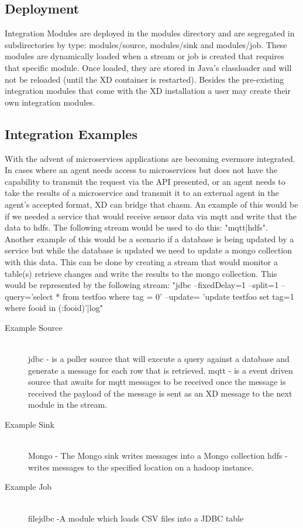 \subsection{Deployment}
Integration Modules are deployed in the modules directory and are segregated in 
subdirectories by type: modules/source, modules/sink and modules/job.  
These modules are dynamically loaded when a stream or job is created that requires that 
specific module.  Once loaded, they are stored in Java's classloader and will not be 
reloaded (until the XD container is restarted).  Besides the pre-existing integration 
modules that come with the XD installation a user may create their own integration 
modules. \par

\subsection{Integration Examples}
With the advent of microservices \cite{microservices-pattern} applications are becoming 
evermore integrated.  In cases where an agent needs access to microservices but does not 
have the capability to transmit the request via the API presented, or an agent needs to 
take the results of a microservice and transmit it to  an external agent in the agent's 
accepted format, XD can bridge that chasm. 
An example of this would be if we needed a service that would receive sensor data via mqtt 
and write that the data to hdfs. The following stream would be used to do this: "mqtt|hdfs".
Another example of this would be a scenario if a database is being updated by a service 
but while the database is updated we need to update a mongo collection 
with this data.  This can be done by creating a stream that would monitor a table(s) 
retrieve changes and write the results to the mongo collection.  This would be 
represented by the following stream: 
"jdbc --fixedDelay=1 --split=1 --query='select * from testfoo where tag = 0' --update=
'update testfoo set tag=1 where fooid in (:fooid)'|log" 
\begin{description}
\item[Example Source] \hfill \\
jdbc - is a poller source that will execute a query against a database and generate a 
message for each row that is retrieved.  \cite{jdbc-module}
mqtt - is a event driven source that awaits for mqtt messages to be received once the message is
 received the payload of the message is sent as an XD message to the next module in the 
 stream.  \cite{mqtt-module}
\item[Example Sink] \hfill \\
Mongo - The Mongo sink writes messages into a Mongo collection \cite{mongo-module}
hdfs - writes messages to the specified location on a hadoop instance. \cite{hadoop-hdfs-module}
\item[Example Job] \hfill \\
filejdbc -A module which loads CSV files into a JDBC table\par
\end{description}
